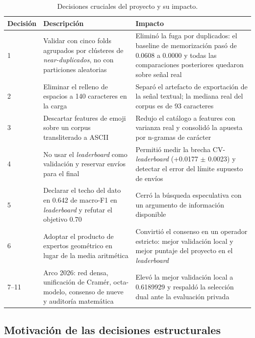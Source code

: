 \documentclass[journal]{IEEEtai}
\begin{document}
\begin{table}[htbp]
\centering
\caption{Decisiones cruciales del proyecto y su impacto.}
\label{tab:decisiones}
\begin{tabular}{p{}p{}p{}}
\toprule
Decisi\'on & Descripci\'on & Impacto \\
\midrule
1 & Validar con cinco folds agrupados por cl\'usteres de \textit{near-duplicados}, no con particiones aleatorias & Elimin\'o la fuga por duplicados: el baseline de memorizaci\'on pas\'o de 0.0608 a 0.0000 y todas las comparaciones posteriores quedaron sobre se\~nal real \\
2 & Eliminar el relleno de espacios a 140 caracteres en la carga & Separ\'o el artefacto de exportaci\'on de la se\~nal textual; la mediana real del corpus es de 93 caracteres \\
3 & Descartar features de emoji sobre un corpus transliterado a ASCII & Redujo el cat\'alogo a features con varianza real y consolid\'o la apuesta por n-gramas de car\'acter \\
4 & No usar el \textit{leaderboard} como validaci\'on y reservar env\'ios para el final & Permiti\'o medir la brecha CV-\textit{leaderboard} (+0.0177 $\pm$ 0.0023) y detectar el error del l\'imite supuesto de env\'ios \\
5 & Declarar el techo del dato en 0.642 de macro-F1 en \textit{leaderboard} y refutar el objetivo 0.70 & Cerr\'o la b\'usqueda especulativa con un argumento de informaci\'on disponible \\
6 & Adoptar el producto de expertos geom\'etrico en lugar de la media aritm\'etica & Convirti\'o el consenso en un operador estricto: mejor validaci\'on local y mejor puntaje del proyecto en el \textit{leaderboard} \\
7--11 & Arco 2026: red densa, unificaci\'on de Cram\'er, octa-modelo, consenso de nueve y auditor\'ia matem\'atica & Elev\'o la mejor validaci\'on local a 0.6189929 y respald\'o la selecci\'on dual ante la evaluaci\'on privada \\
\bottomrule
\end{tabular}
\end{table}

\subsection{Motivaci\'on de las decisiones estructurales}
\end{document}
